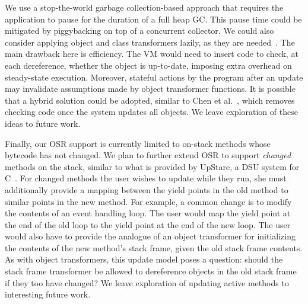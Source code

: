 \documentclass[9pt]{sigplanconf}
\begin{document}

We use a stop-the-world garbage collection-based approach
that requires the application to pause for the
duration of a full heap GC\@.  This pause time could be mitigated by
piggybacking on top of a concurrent
collector.  We could also consider applying object and 
class transformers lazily, as they are
needed~\cite{ritzau00dynamic,Mala00a,boyapati03lazy,neamtiu06dsu,chen:icse07}.  The
main drawback here is efficiency. The VM would need to insert code to check, at each
dereference, whether the object is up-to-date, imposing extra overhead
on steady-state execution.  Moreover, stateful actions by the program after
an update may invalidate assumptions made by object transformer
functions. It is possible that a hybrid solution could be adopted,
similar to Chen et al.~\cite{chen:icse07}, which removes checking
code once the system updates all objects.  We leave
exploration of these ideas to future work.

Finally, our OSR support is currently limited to on-stack methods
whose bytecode has not changed.  We plan to further extend OSR to
support \emph{changed} methods on the stack, similar to what is
provided by UpStare, a DSU system for C~\cite{upstare}.  For changed
methods the user wishes to update while they run, she must
additionally provide a mapping between the yield points in the old
method to similar points in the new method.  For example, a common
change is to modify the contents of an event handling loop.  The user
would map the yield point at the end of the old loop to the yield
point at the end of the new loop. The user would also have to provide
the analogue of an object transformer for initializing the contents of
the new method's stack frame, given the old stack frame contents.  As
with object transformers, this update model poses a question: should
the stack frame transformer be allowed to dereference objects in the
old stack frame if they too have changed?  We leave exploration of
updating active methods to interesting future work.
\end{document}
